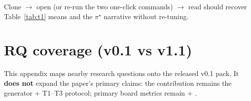 \documentclass[sigconf,review]{acmart}
\newcommand{\pistar}{\pi^\star}
\begin{document}
Clone $\rightarrow$ open  (or re-run the two one-click commands) $\rightarrow$ read  should recover Table~\ref{tab:t1} means and the $\pistar$ narrative without re-tuning.

\section{RQ coverage (v0.1 vs v1.1)}
\label{app:rq}

This appendix maps nearby research questions onto the released v0.1 pack. It \textbf{does not} expand the paper's primary claims: the contribution remains the generator + T1--T3 protocol; primary board metrics remain  + .
\end{document}
